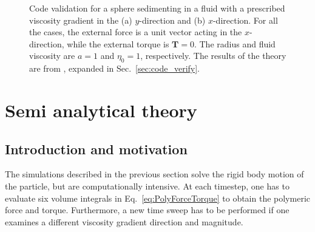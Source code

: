 \documentclass{jfm}
\begin{document}
\begin{figure}
\centering
{}

\caption{Code validation for a sphere sedimenting in a fluid with a prescribed viscosity gradient in the (a) $y$-direction and (b) $x$-direction. For all the cases, the external force is a unit vector acting in the $x$-direction, while the external torque is $\boldsymbol{T}=0$. The radius and fluid viscosity are $a = 1$ and $\eta_0 = 1$, respectively. The results of the theory are from \citep{Datt_Elfring_Viscosity_Gradient}, expanded in Sec.~\ref{sec:code_verify}.}
\label{fig:Sphere_Verification}
\end{figure}



\section{Semi analytical theory}
\label{sec:theory}


\subsection{Introduction and motivation}
\label{sec:analytical_development}
The simulations described in the previous section solve the rigid body motion of the particle, but are computationally intensive.  At each timestep, one has to evaluate six volume integrals in Eq.~\eqref{eq:PolyForceTorque} to obtain the polymeric force and torque.  Furthermore, a new time sweep has to be performed if one examines a different viscosity gradient direction and magnitude. 
\end{document}
